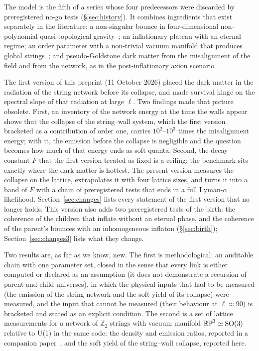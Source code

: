 \documentclass[11pt,a4paper]{article}
\newcommand{\RP}{\mathbb{RP}^3}
\newcommand{\Ztwo}{\mathbb{Z}_2}
\begin{document}
The model is the fifth of a series whose four predecessors were discarded by preregistered no-go tests (\S\ref{sec:history}).
It combines ingredients that exist separately in the literature: a non-singular bounce in four-dimensional non-polynomial quasi-topological gravity~\cite{Bueno2025formation,BorissovaMagueijo2026}; an inflationary plateau with an eternal regime; an order parameter with a non-trivial vacuum manifold that produces global strings~\cite{Kibble1976,VilenkinShellard}; and pseudo-Goldstone dark matter from the misalignment of the field and from the network, as in the post-inflationary axion scenario~\cite{GHV2018,GHV2021,Buschmann2022,Hindmarsh2021approach,Saikawa2024,KimParkSon2024,Correia2025spectrum}.

The first version of this preprint (11 October 2026) placed the dark matter in the radiation of the string network before its collapse, and made survival hinge on the spectral slope of that radiation at large $\ell$.
Two findings made that picture obsolete.
First, an inventory of the network energy at the time the walls appear shows that the collapse of the string--wall system, which the first version bracketed as a contribution of order one, carries $10^2$--$10^3$ times the misalignment energy; with it, the emission before the collapse is negligible and the question becomes how much of that energy ends as soft quanta.
Second, the decay constant $F$ that the first version treated as fixed is a ceiling: the benchmark sits exactly where the dark matter is hottest.
The present version measures the collapse on the lattice, extrapolates it with four lattice sizes, and turns it into a band of $F$ with a chain of preregistered tests that ends in a full Lyman-$\alpha$ likelihood.
Section~\ref{sec:changes} lists every statement of the first version that no longer holds.
This version also adds two preregistered tests of the birth: the coherence of the children that inflate without an eternal phase, and the coherence of the parent's bounces with an inhomogeneous inflaton (\S\ref{sec:birth}); Section~\ref{sec:changes3} lists what they change.

Two results are, as far as we know, new.
The first is methodological: an auditable chain with one parameter set, closed in the sense that every link is either computed or declared as an assumption (it does not demonstrate a recursion of parent and child universes), in which the physical inputs that had to be measured (the emission of the string network and the soft yield of its collapse) were measured, and the input that cannot be measured (their behaviour at $\ell\approx90$) is bracketed and stated as an explicit condition.
The second is a set of lattice measurements for a network of $\Ztwo$ strings with vacuum manifold $\RP\simeq{\rm SO}(3)$ relative to U(1) in the same code: the density and emission ratios, reported in a companion paper~\cite{rp3_paper}, and the soft yield of the string--wall collapse, reported here.
\end{document}
